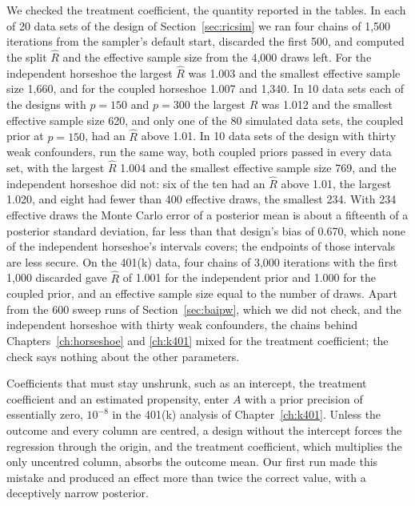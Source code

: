 We checked the treatment coefficient, the quantity reported in the tables. In each of 20 data sets of the design of Section~\ref{sec:ricsim} we ran four chains of 1,500 iterations from the sampler's default start, discarded the first 500, and computed the split $\hat R$ and the effective sample size from the 4,000 draws left. For the independent horseshoe the largest $\hat R$ was 1.003 and the smallest effective sample size 1,660, and for the coupled horseshoe 1.007 and 1,340. In 10 data sets each of the designs with $p = 150$ and $p = 300$ the largest $\hat R$ was 1.012 and the smallest effective sample size 620, and only one of the 80 simulated data sets, the coupled prior at $p = 150$, had an $\hat R$ above 1.01. In 10 data sets of the design with thirty weak confounders, run the same way, both coupled priors passed in every data set, with the largest $\hat R$ 1.004 and the smallest effective sample size 769, and the independent horseshoe did not: six of the ten had an $\hat R$ above 1.01, the largest 1.020, and eight had fewer than 400 effective draws, the smallest 234. With 234 effective draws the Monte Carlo error of a posterior mean is about a fifteenth of a posterior standard deviation, far less than that design's bias of 0.670, which none of the independent horseshoe's intervals covers; the endpoints of those intervals are less secure. On the 401(k) data, four chains of 3,000 iterations with the first 1,000 discarded gave $\hat R$ of 1.001 for the independent prior and 1.000 for the coupled prior, and an effective sample size equal to the number of draws. Apart from the 600 sweep runs of Section~\ref{sec:baipw}, which we did not check, and the independent horseshoe with thirty weak confounders, the chains behind Chapters~\ref{ch:horseshoe} and \ref{ch:k401} mixed for the treatment coefficient; the check says nothing about the other parameters.

Coefficients that must stay unshrunk, such as an intercept, the treatment coefficient and an estimated propensity, enter $A$ with a prior precision of essentially zero, $10^{-8}$ in the 401(k) analysis of Chapter~\ref{ch:k401}. Unless the outcome and every column are centred, a design without the intercept forces the regression through the origin, and the treatment coefficient, which multiplies the only uncentred column, absorbs the outcome mean. Our first run made this mistake and produced an effect more than twice the correct value, with a deceptively narrow posterior.

